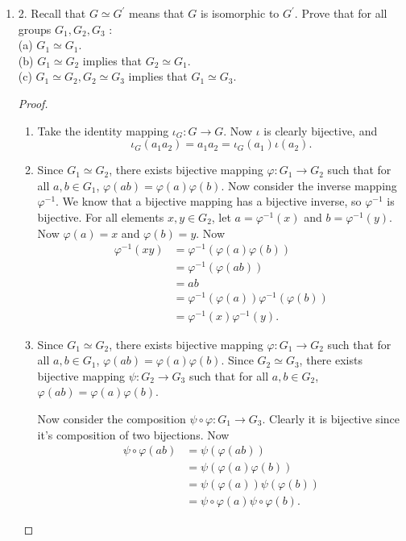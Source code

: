 \begin{enumerate}[resume]
	\item 2. Recall that $G \simeq G^{\prime}$ means that $G$ is isomorphic to $G^{\prime}$. Prove that for all groups $G_1, G_2, G_3$ :\\
(a) $G_1 \simeq G_1$.\\
(b) $G_1 \simeq G_2$ implies that $G_2 \simeq G_1$.\\
(c) $G_1 \simeq G_2, G_2 \simeq G_3$ implies that $G_1 \simeq G_3$.
\begin{proof}
	\begin{enumerate}
		\item Take the identity mapping $\iota_G: G \to  G$. Now $\iota$ is clearly bijective, and \[
			\iota_G(a_1 a_2) = a_1 a_2 = \iota_G(a_1)\iota(a_2)
		.\] 
		\item Since $G_1 \simeq G_2$, there exists bijective mapping $\varphi: G_1 \to  G_2$ such that for all $a, b \in G_1$, $\varphi(ab) = \varphi(a) \varphi(b)$. Now consider the inverse mapping $\varphi^{-1}$. We know that a bijective mapping has a bijective inverse, so $\varphi^{-1}$ is bijective. For all elements $x, y \in G_2$, let  $a = \varphi^{-1} (x)$ and $b = \varphi^{-1} (y)$. Now $\varphi(a) = x$ and $\varphi(b) = y$. Now \begin{align*}
		\varphi^{-1} (xy) &= \varphi^{-1} (\varphi(a)\varphi(b)) \\
				  &= \varphi^{-1} (\varphi(ab)) \\
				  &= ab \\
				  &= \varphi^{-1} (\varphi(a)) \varphi^{-1}(\varphi(b)) \\
				  &= \varphi^{-1} (x) \varphi^{-1} (y)
		.\end{align*} 
		\item  Since $G_1 \simeq G_2$, there exists bijective mapping $\varphi: G_1 \to  G_2$ such that for all $a, b \in G_1$, $\varphi(ab) = \varphi(a) \varphi(b)$. Since $G_2 \simeq G_3$, there exists bijective mapping $\psi: G_2 \to  G_3$ such that for all $a, b \in G_2$, $\varphi(ab) = \varphi(a) \varphi(b)$. 

			Now consider the composition $\psi \circ \varphi: G_1 \to  G_3$. Clearly it is bijective since it's composition of two bijections. Now
		\begin{align*}
			\psi \circ \varphi (ab) &= \psi \left( \varphi(ab) \right)  \\
			&= \psi\left( \varphi(a)\varphi(b) \right)  \\
			&= \psi\left( \varphi(a) \right)\psi\left( \varphi(b) \right)  \\
			&=  \psi \circ \varphi (a)\psi \circ \varphi (b)
		.\end{align*}
	\end{enumerate}
\end{proof}


\end{enumerate}
